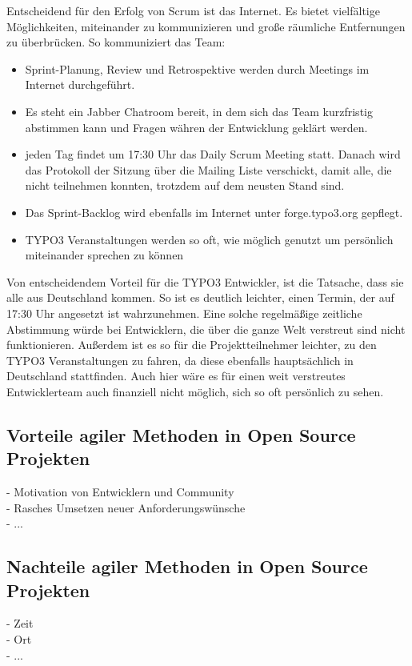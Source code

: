 Entscheidend für den Erfolg von Scrum ist das Internet. Es bietet vielfältige Möglichkeiten,
miteinander zu kommunizieren und große räumliche Entfernungen zu überbrücken. So kommuniziert das
Team:
\begin{itemize}
\item Sprint-Planung, Review und Retrospektive werden durch Meetings im Internet durchgeführt.
\item Es steht ein Jabber Chatroom bereit, in dem sich das Team kurzfristig abstimmen kann und
Fragen währen der Entwicklung geklärt werden.
\item jeden Tag findet um 17:30 Uhr das Daily Scrum Meeting statt. Danach wird das Protokoll der
Sitzung über die Mailing Liste verschickt, damit alle, die nicht teilnehmen konnten, trotzdem auf
dem neusten Stand sind.
\item Das Sprint-Backlog wird ebenfalls im Internet unter forge.typo3.org gepflegt.
\item TYPO3 Veranstaltungen werden so oft, wie möglich genutzt um persönlich miteinander sprechen
zu können
\end{itemize}

Von entscheidendem Vorteil für die TYPO3 Entwickler, ist die Tatsache, dass sie alle aus
Deutschland kommen. So ist es deutlich leichter, einen Termin, der auf 17:30 Uhr angesetzt ist
wahrzunehmen. Eine solche regelmäßige zeitliche Abstimmung würde bei Entwicklern, die über die
ganze Welt verstreut sind nicht funktionieren. Außerdem ist es so für die Projektteilnehmer
leichter, zu den TYPO3 Veranstaltungen zu fahren, da diese ebenfalls hauptsächlich in Deutschland
stattfinden. Auch hier wäre es für einen weit verstreutes Entwicklerteam auch finanziell nicht
möglich, sich so oft persönlich zu sehen.


\subsection{Vorteile agiler Methoden in Open Source Projekten}
  - Motivation von Entwicklern und Community\\
  - Rasches Umsetzen neuer Anforderungswünsche\\
  - ...
  
\subsection{Nachteile agiler Methoden in Open Source Projekten}
  - Zeit\\
  - Ort\\
  - ...



